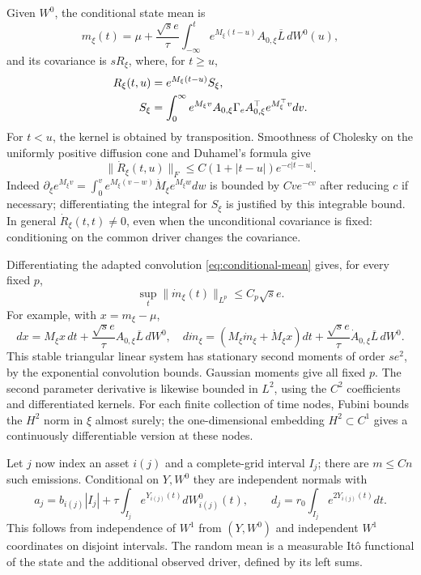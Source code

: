 \documentclass[11pt,a4paper]{amsart}
\theoremstyle{plain}
\theoremstyle{definition}
\theoremstyle{remark}
\begin{document}
Given $W^0$, the conditional state mean is
\begin{equation}\label{eq:conditional-mean}
 m_\xi(t)=\mu+\frac{\sqrt{s}e}{\tau}
 \int_{-\infty}^t e^{M_\xi(t-u)}A_{0,\xi}\overline L\,dW^0(u),
\end{equation}
and its covariance is $sR_\xi$, where, for $t\ge u$,
\begin{align}\label{eq:conditional-cov}
 R_\xi(t,u)&=e^{M_\xi(t-u)}S_\xi,\notag\\
 S_\xi&=\int_0^\infty e^{M_\xi v}A_{0,\xi}\Gamma_e A_{0,\xi}^\top
                                      e^{M_\xi^\top v}dv.
\end{align}
For $t<u$, the kernel is obtained by transposition. Smoothness of Cholesky
on the uniformly positive diffusion cone and Duhamel's formula give
\begin{equation}\label{eq:R-derivative}
 \|\dot R_\xi(t,u)\|_F\le C(1+|t-u|)e^{-c|t-u|}.
\end{equation}
Indeed
$\partial_\xi e^{M_\xi v}
 =\int_0^v e^{M_\xi(v-w)}\dot M_\xi e^{M_\xi w}dw$
is bounded by $Cv e^{-cv}$ after reducing $c$ if necessary; differentiating
the integral for $S_\xi$ is justified by this integrable bound.
In general $\dot R_\xi(t,t)\ne0$, even when the unconditional covariance
is fixed: conditioning on the common driver changes the covariance.

Differentiating the adapted convolution \eqref{eq:conditional-mean}
gives, for every fixed $p$,
\begin{equation}\label{eq:m-derivative}
 \sup_t\|\dot m_\xi(t)\|_{L^p}\le C_p\sqrt{s}e.
\end{equation}
For example, with $x=m_\xi-\mu$,
\[
 dx=M_\xi x\,dt+\frac{\sqrt{s}e}{\tau}A_{0,\xi}\overline L\,dW^0,
 \quad
 d\dot m_\xi=(M_\xi\dot m_\xi+\dot M_\xi x)dt
       +\frac{\sqrt{s}e}{\tau}\dot A_{0,\xi}\overline L\,dW^0.
\]
This stable triangular linear system has stationary second moments of
order $se^2$, by the exponential convolution bounds. Gaussian moments
give all fixed $p$. The second parameter derivative is likewise bounded
in $L^2$, using the $C^2$ coefficients and differentiated kernels.
For each finite collection of time nodes, Fubini bounds the $H^2$ norm
in $\xi$ almost surely; the one-dimensional embedding $H^2\subset C^1$
gives a continuously differentiable version at these nodes.

Let $j$ now index an asset $i(j)$ and a complete-grid interval $I_j$;
there are $m\le Cn$ such emissions. Conditional on $Y,W^0$ they are
independent normals with
\begin{equation}\label{eq:conditional-emission}
 a_j=b_{i(j)}|I_j|+\tau\int_{I_j}e^{Y_{i(j)}(t)}dW^0_{i(j)}(t),
 \qquad d_j=r_0\int_{I_j}e^{2Y_{i(j)}(t)}dt.
\end{equation}
This follows from independence of $W^1$ from $(Y,W^0)$ and independent
$W^1$ coordinates on disjoint intervals. The random mean is a measurable
It\^o functional of the state and the additional observed driver, defined
by its left sums.
\end{document}
